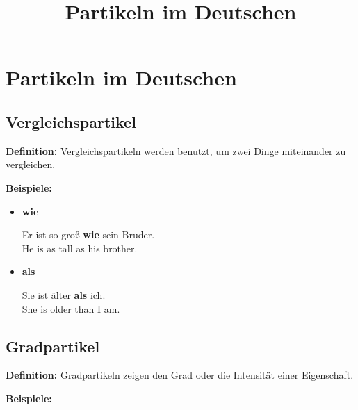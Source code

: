 \documentclass{article}
\title{Partikeln im Deutschen}
\date{}
\begin{document}
    
    \maketitle
    
    
    \section{Partikeln im Deutschen}
        
        \subsection{Vergleichspartikel}
            
            \textbf{Definition:} Vergleichspartikeln werden benutzt, um zwei Dinge miteinander zu vergleichen.
            
            \textbf{Beispiele:}
            
            \begin{itemize}
                
                \item \textbf{wie}
                
                Er ist so groß \textbf{wie} sein Bruder.\\
                He is as tall as his brother.
                
                \item \textbf{als}
                
                Sie ist älter \textbf{als} ich.\\
                She is older than I am.
            
            \end{itemize}
        
        \subsection{Gradpartikel}
            
            \textbf{Definition:} Gradpartikeln zeigen den Grad oder die Intensität einer Eigenschaft.
            
            \textbf{Beispiele:}
            
\end{document}
